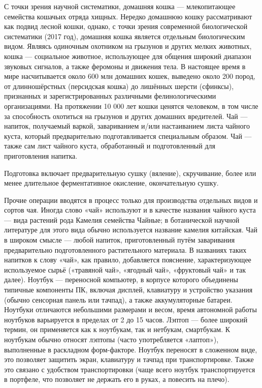 \begin{frame}
	С точки зрения научной систематики, домашняя кошка — млекопитающее семейства кошачьих отряда хищных. Нередко домашнюю кошку рассматривают как подвид лесной кошки, однако, с точки зрения современной биологической систематики (2017 год), домашняя кошка является отдельным биологическим видом. Являясь одиночным охотником на грызунов и других мелких животных, кошка — социальное животное, использующее для общения широкий диапазон звуковых сигналов, а также феромоны и движения тела. В настоящее время в мире насчитывается около 600 млн домашних кошек, выведено около 200 пород, от длинношёрстных (персидская кошка) до лишённых шерсти (сфинксы), признанных и зарегистрированных различными фелинологическими организациями. На протяжении 10 000 лет кошки ценятся человеком, в том числе за способность охотиться на грызунов и других домашних вредителей. Чай — напиток, получаемый варкой, завариванием и/или настаиванием листа чайного куста, который предварительно подготавливается специальным образом. Чай — также сам лист чайного куста, обработанный и подготовленный для приготовления напитка.
\end{frame}

\begin{frame}
	Подготовка включает предварительную сушку (вяление), скручивание, более или менее длительное ферментативное окисление, окончательную сушку.
\end{frame}

\begin{frame}
	Прочие операции вводятся в процесс только для производства отдельных видов и сортов чая. Иногда слово «чай» используют и в качестве названия чайного куста — вида растений рода Камелия семейства Чайные; в ботанической научной литературе для этого вида обычно используется название камелия китайская. Чай в широком смысле — любой напиток, приготовленный путём заваривания предварительно подготовленного растительного материала. В названиях таких напитков к слову «чай», как правило, добавляется пояснение, характеризующее используемое сырьё («травяной чай», «ягодный чай», «фруктовый чай» и так далее). Ноутбук — переносной компьютер, в корпусе которого объединены типичные компоненты ПК, включая дисплей, клавиатуру и устройство указания (обычно сенсорная панель или тачпад), а также аккумуляторные батареи. Ноутбуки отличаются небольшими размерами и весом, время автономной работы ноутбуков варьируется в пределах от 2 до 15 часов. Лэптоп — более широкий термин, он применяется как к ноутбукам, так и нетбукам, смартбукам. К ноутбукам обычно относят лэптопы (часто употребляется «лаптоп»), выполненные в раскладном форм-факторе. Ноутбук переносят в сложенном виде, это позволяет защитить экран, клавиатуру и тачпад при транспортировке. Также это связано с удобством транспортировки (чаще всего ноутбук транспортируется в портфеле, что позволяет не держать его в руках, а повесить на плечо).
\end{frame}

